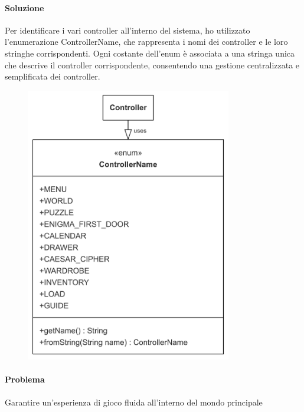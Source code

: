 \documentclass[a4paper,12pt]{report}
\begin{document}
\paragraph{Soluzione} Per identificare i vari controller all’interno del sistema, ho utilizzato l’enumerazione ControllerName, che rappresenta i nomi dei controller e le loro stringhe corrispondenti. Ogni costante dell’enum è associata a una stringa unica che descrive il controller corrispondente, consentendo una gestione centralizzata e semplificata dei controller.
\begin{figure}   %
    \centering
    \includegraphics[width=0.8\textwidth]{img/controllerName.png}  %
    \label{img:controllerName}
\end{figure}

\paragraph{Problema} Garantire un’esperienza di gioco fluida all’interno del mondo principale
\end{document}
